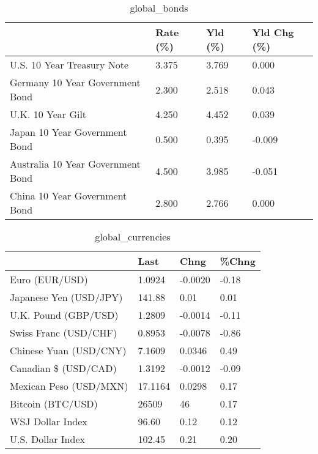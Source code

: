 \documentclass{article}%
\begin{document}
%


\begin{table}[htbp]%
\caption{global\_bonds}%
\centering%
\begin{adjustbox}{width=1\textwidth}%
\begin{tabular}{llll}
\toprule
                                  & Rate (\%) & Yld (\%) & Yld Chg (\%) \\
\midrule
       U.S. 10 Year Treasury Note &    3.375 &   3.769 &       0.000 \\
  Germany 10 Year Government Bond &    2.300 &   2.518 &       0.043 \\
                U.K. 10 Year Gilt &    4.250 &   4.452 &       0.039 \\
    Japan 10 Year Government Bond &    0.500 &   0.395 &      -0.009 \\
Australia 10 Year Government Bond &    4.500 &   3.985 &      -0.051 \\
    China 10 Year Government Bond &    2.800 &   2.766 &       0.000 \\
\bottomrule
\end{tabular}
%
\end{adjustbox}%
\end{table}

%


\begin{table}[htbp]%
\caption{global\_currencies}%
\centering%
\begin{adjustbox}{width=1\textwidth}%
\begin{tabular}{llll}
\toprule
                       &    Last &    Chng & \%Chng \\
\midrule
        Euro (EUR/USD) &  1.0924 & -0.0020 & -0.18 \\
Japanese Yen (USD/JPY) &  141.88 &    0.01 &  0.01 \\
  U.K. Pound (GBP/USD) &  1.2809 & -0.0014 & -0.11 \\
 Swiss Franc (USD/CHF) &  0.8953 & -0.0078 & -0.86 \\
Chinese Yuan (USD/CNY) &  7.1609 &  0.0346 &  0.49 \\
  Canadian \$ (USD/CAD) &  1.3192 & -0.0012 & -0.09 \\
Mexican Peso (USD/MXN) & 17.1164 &  0.0298 &  0.17 \\
     Bitcoin (BTC/USD) &   26509 &      46 &  0.17 \\
      WSJ Dollar Index &   96.60 &    0.12 &  0.12 \\
     U.S. Dollar Index &  102.45 &    0.21 &  0.20 \\
\bottomrule
\end{tabular}
%
\end{adjustbox}%
\end{table}
\end{document}
